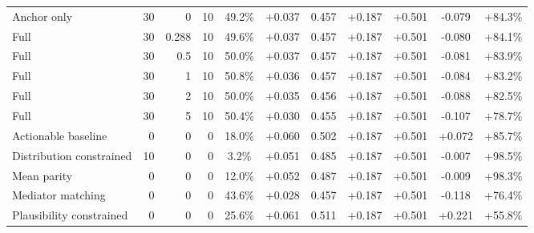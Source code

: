 \begin{table}[htbp]
\begin{tabular}{lrrrccccccc}
Anchor only & 30 & 0 & 10 & 49.2\% & +0.037 & 0.457 & +0.187 & +0.501 & -0.079 & +84.3\% \\
Full & 30 & 0.288 & 10 & 49.6\% & +0.037 & 0.457 & +0.187 & +0.501 & -0.080 & +84.1\% \\
Full & 30 & 0.5 & 10 & 50.0\% & +0.037 & 0.457 & +0.187 & +0.501 & -0.081 & +83.9\% \\
Full & 30 & 1 & 10 & 50.8\% & +0.036 & 0.457 & +0.187 & +0.501 & -0.084 & +83.2\% \\
Full & 30 & 2 & 10 & 50.0\% & +0.035 & 0.456 & +0.187 & +0.501 & -0.088 & +82.5\% \\
Full & 30 & 5 & 10 & 50.4\% & +0.030 & 0.455 & +0.187 & +0.501 & -0.107 & +78.7\% \\
Actionable baseline & 0 & 0 & 0 & 18.0\% & +0.060 & 0.502 & +0.187 & +0.501 & +0.072 & +85.7\% \\
Distribution constrained & 10 & 0 & 0 & 3.2\% & +0.051 & 0.485 & +0.187 & +0.501 & -0.007 & +98.5\% \\
Mean parity & 0 & 0 & 0 & 12.0\% & +0.052 & 0.487 & +0.187 & +0.501 & -0.009 & +98.3\% \\
Mediator matching & 0 & 0 & 0 & 43.6\% & +0.028 & 0.457 & +0.187 & +0.501 & -0.118 & +76.4\% \\
Plausibility constrained & 0 & 0 & 0 & 25.6\% & +0.061 & 0.511 & +0.187 & +0.501 & +0.221 & +55.8\% \\
\bottomrule
\end{tabular}
\end{table}
